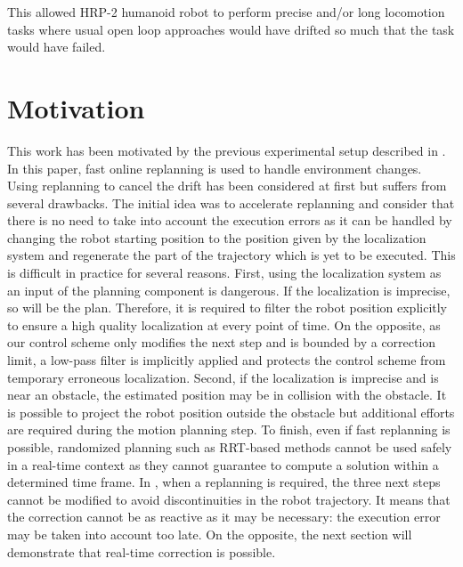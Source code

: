 This allowed HRP-2 humanoid robot to perform precise and/or long
locomotion tasks where usual open loop approaches would have drifted
so much that the task would have failed.


\section{Motivation}


This work has been motivated by the previous experimental setup
described in \cite{11humanoids.baudouin}. In this paper, fast online
replanning is used to handle environment changes. Using replanning to
cancel the drift has been considered at first but suffers from several
drawbacks. The initial idea was to accelerate replanning and consider
that there is no need to take into account the execution errors as it
can be handled by changing the robot starting position to the position
given by the localization system and regenerate the part of the
trajectory which is yet to be executed. This is difficult in practice
for several reasons. First, using the localization system as an input
of the planning component is dangerous. If the localization is
imprecise, so will be the plan. Therefore, it is required to filter
the robot position explicitly to ensure a high quality localization at
every point of time. On the opposite, as our control scheme only
modifies the next step and is bounded by a correction limit, a
low-pass filter is implicitly applied and protects the control scheme
from temporary erroneous localization. Second, if the localization is
imprecise and is near an obstacle, the estimated position may be in
collision with the obstacle. It is possible to project the robot
position outside the obstacle but additional efforts are required
during the motion planning step. To finish, even if fast replanning is
possible, randomized planning such as RRT-based methods cannot be used
safely in a real-time context as they cannot guarantee to compute a
solution within a determined time frame. In
\cite{11humanoids.baudouin}, when a replanning is required, the three
next steps cannot be modified to avoid discontinuities in the robot
trajectory. It means that the correction cannot be as reactive as it
may be necessary: the execution error may be taken into account too
late. On the opposite, the next section will demonstrate that
real-time correction is possible.


